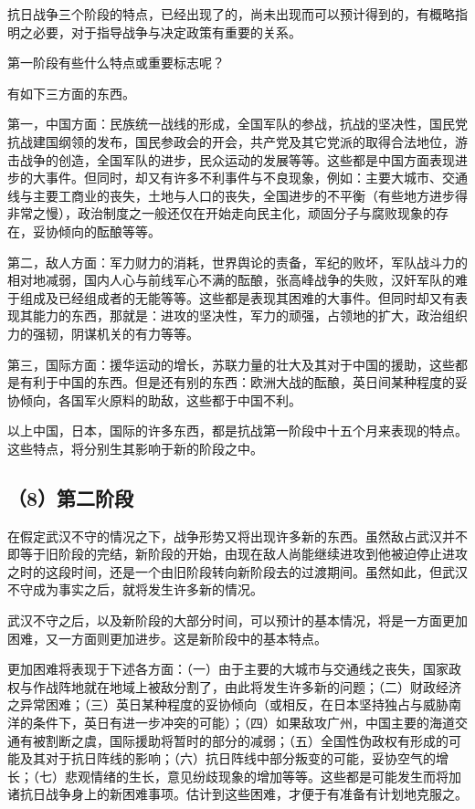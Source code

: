 抗日战争三个阶段的特点，已经出现了的，尚未出现而可以预计得到的，有概略指明之必要，对于指导战争与决定政策有重要的关系。

第一阶段有些什么特点或重要标志呢？

有如下三方面的东西。

第一，中国方面：民族统一战线的形成，全国军队的参战，抗战的坚决性，国民党抗战建国纲领的发布，国民参政会的开会，共产党及其它党派的取得合法地位，游击战争的创造，全国军队的进步，民众运动的发展等等。这些都是中国方面表现进步的大事件。但同时，却又有许多不利事件与不良现象，例如：主要大城市、交通线与主要工商业的丧失，土地与人口的丧失，全国进步的不平衡（有些地方进步得非常之慢），政治制度之一般还仅在开始走向民主化，顽固分子与腐败现象的存在，妥协倾向的酝酿等等。

第二，敌人方面：军力财力的消耗，世界舆论的责备，军纪的败坏，军队战斗力的相对地减弱，国内人心与前线军心不满的酝酿，张高峰战争的失败，汉奸军队的难于组成及已经组成者的无能等等。这些都是表现其困难的大事件。但同时却又有表现其能力的东西，那就是：进攻的坚决性，军力的顽强，占领地的扩大，政治组织力的强韧，阴谋机关的有力等等。

第三，国际方面：援华运动的增长，苏联力量的壮大及其对于中国的援助，这些都是有利于中国的东西。但是还有别的东西：欧洲大战的酝酿，英日间某种程度的妥协倾向，各国军火原料的助敌，这些都于中国不利。

以上中国，日本，国际的许多东西，都是抗战第一阶段中十五个月来表现的特点。这些特点，将分别生其影响于新的阶段之中。

\subsection{（8）第二阶段}

在假定武汉不守的情况之下，战争形势又将出现许多新的东西。虽然敌占武汉并不即等于旧阶段的完结，新阶段的开始，由现在敌人尚能继续进攻到他被迫停止进攻之时的这段时间，还是一个由旧阶段转向新阶段去的过渡期间。虽然如此，但武汉不守成为事实之后，就将发生许多新的情况。

武汉不守之后，以及新阶段的大部分时间，可以预计的基本情况，将是一方面更加困难，又一方面则更加进步。这是新阶段中的基本特点。

更加困难将表现于下述各方面：（一）由于主要的大城市与交通线之丧失，国家政权与作战阵地就在地域上被敌分割了，由此将发生许多新的问题；（二）财政经济之异常困难；（三）英日某种程度的妥协倾向（或相反，在日本坚持独占与威胁南洋的条件下，英日有进一步冲突的可能）；（四）如果敌攻广州，中国主要的海道交通有被割断之虞，国际援助将暂时的部分的减弱；（五）全国性伪政权有形成的可能及其对于抗日阵线的影响；（六）抗日阵线中部分叛变的可能，妥协空气的增长；（七）悲观情绪的生长，意见纷歧现象的增加等等。这些都是可能发生而将加诸抗日战争身上的新困难事项。估计到这些困难，才便于有准备有计划地克服之。

